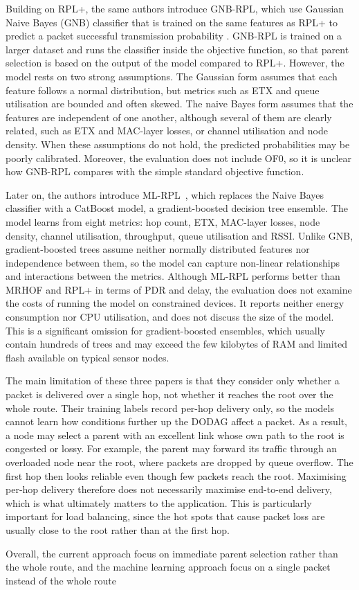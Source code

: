 Building on RPL+, the same authors introduce GNB-RPL, which use
Gaussian Naive Bayes (GNB) classifier
that is trained on the same features as RPL+ to predict a packet
successful transmission probability \cite{mezherGNBRPLGaussianNaive2023}.
GNB-RPL is trained on a larger dataset and runs the
classifier inside the objective function, so that parent
selection is based on the output of the model compared to RPL+.
However, the model rests on two strong assumptions. The Gaussian form
assumes that each feature follows a normal distribution, but metrics
such as ETX and queue utilisation are bounded and often skewed. The
naive Bayes form assumes that the features are independent of one
another, although several of them are clearly related, such as ETX
and MAC-layer losses, or channel utilisation and node density. When
these assumptions do not hold, the predicted probabilities may be
poorly calibrated. Moreover, the evaluation does not
include OF0, so it is unclear how GNB-RPL compares with the simple
standard objective function.

Later on, the authors introduce
ML-RPL~\cite{santosMLRPLMachineLearningBased2023}, which replaces the
Naive Bayes classifier with a CatBoost model, a gradient-boosted
decision tree ensemble. The model learns from eight metrics: hop
count, ETX, MAC-layer losses, node density, channel utilisation,
throughput, queue utilisation and RSSI. Unlike GNB,
gradient-boosted trees assume neither normally distributed features
nor independence between them, so the model can capture non-linear
relationships and interactions between the metrics.
Although ML-RPL performs better than MRHOF and RPL+ in terms of PDR and delay,
the evaluation does not examine the costs of running the
model on constrained devices. It reports neither energy consumption
nor CPU utilisation, and does not discuss the size of the model.
This is a significant omission for gradient-boosted ensembles, which
usually contain hundreds of trees and may exceed the few kilobytes of
RAM and limited flash available on typical sensor nodes.

The main limitation of these three papers is that they consider only
whether a packet is delivered over a single hop, not whether it
reaches the root over the whole route. Their training labels record
per-hop delivery only, so the models cannot learn how conditions
further up the DODAG affect a packet. As a result, a node may select a
parent with an excellent link whose own path to the root is congested
or lossy. For example, the parent may forward its traffic through an
overloaded node near the root, where packets are dropped by queue
overflow. The first hop then looks reliable even though few packets
reach the root. Maximising per-hop delivery therefore does not
necessarily maximise end-to-end delivery, which is what ultimately
matters to the application. This is particularly important for load
balancing, since the hot spots that cause packet loss are usually
close to the root rather than at the first hop.

Overall, the current approach focus on immediate parent selection
rather than the whole route, and the machine learning approach focus
on a single packet instead of the whole route
